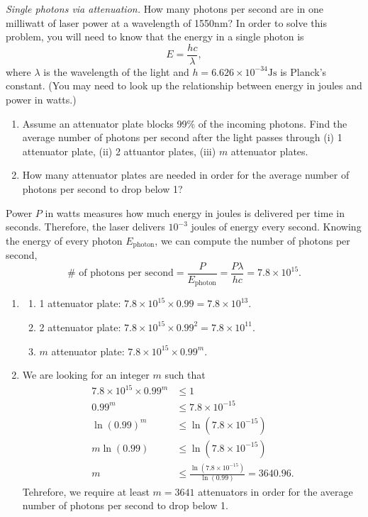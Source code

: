 \begin{exercise}
\emph{Single photons via attenuation.} How many photons per second are in one milliwatt of laser power at a wavelength of 1550nm?  In order to solve this problem, you will need to know that the energy in a single photon is
\begin{equation}
    E = \frac{hc}{\lambda},
\end{equation}
where $\lambda$ is the wavelength of the light and $h=6.626\times 10^{-34} \text{Js}$ is Planck's constant.
(You may need to look up the relationship between energy in joules and power in watts.)
\begin{enumerate}[label=(\alph*)]
    \item Assume an attenuator plate blocks 99\% of the incoming photons.
    Find the average number of photons per second after the light passes through (i) 1 attenuator plate, (ii) 2 attuantor plates, (iii) $m$ attenuator plates.
    \item How many attenuator plates are needed in order for the average number of photons per second to drop below 1?
\end{enumerate}
\end{exercise}
\begin{solution}
Power $P$ in watts measures how much energy in joules is delivered per time in seconds. Therefore, the laser delivers $10^{-3}$ joules of energy every second. Knowing the energy of every photon $E_{\text{photon}}$, we can compute the number of photons per second,
\begin{equation*}
    \#\text{ of photons per second} = \frac{P}{E_{\text{photon}}} = \frac{P\lambda}{hc} = 7.8\times10^{15}.
\end{equation*}
\begin{enumerate}[label=(\alph*)]
    \item \begin{enumerate}[label=(\roman*)]
        \item 1 attenuator plate: $7.8\times10^{15} \times 0.99=7.8\times10^{13}$.
        \item  2 attenuator plate: $7.8\times10^{15} \times 0.99^2=7.8\times10^{11}$.
        \item $m$ attenuator plate: $7.8\times10^{15} \times 0.99^m$.
    \end{enumerate}
    \item We are looking for an integer $m$ such that
    \begin{align*}
        7.8\times10^{15} \times 0.99^m & \leq 1 \\
        0.99^m & \leq 7.8\times10^{-15} \\
        \ln (0.99)^m & \leq \ln (7.8\times10^{-15}) \\
        m\ln (0.99) & \leq \ln (7.8\times10^{-15}) \\
        m & \leq \frac{\ln (7.8\times10^{-15})}{\ln (0.99)} = 3640.96.
    \end{align*}
    Tehrefore, we require at least $m=3641$ attenuators in order for the average number of photons per second to drop below 1. 
\end{enumerate}
\end{solution}